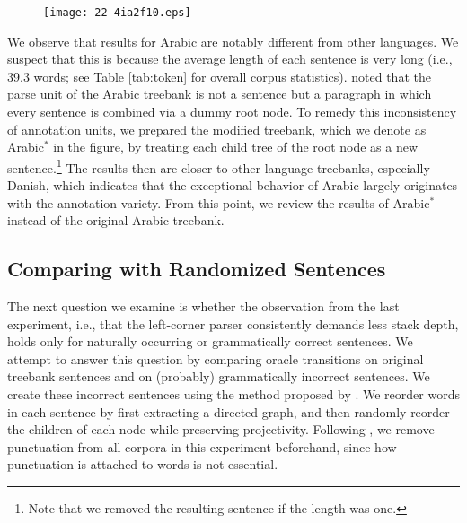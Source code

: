 \documentclass[english]{jnlp_1.4}
\begin{document}
\begin{figure}[p]
\begin{center}
\texttt{[image: 22-4ia2f10.eps]}
\end{center}
\label{fig:load-comparison}
\end{figure}

\begin{table}[p]
\label{tab:token}

\end{table}

We observe that results for Arabic are notably different from other languages.
We suspect that this is because the average length of each sentence is very long (i.e., 39.3 words; see Table \ref{tab:token} for overall corpus statistics).
 noted that the parse unit of the Arabic treebank is not a sentence but a paragraph in which every sentence is combined via a dummy root node.
To remedy this inconsistency of annotation units, we prepared the modified treebank, which we denote as Arabic$^*$ in the figure, by treating each child tree of the root node as a new sentence.\footnote{Note that we removed the resulting sentence if the length was one.}
The results then are closer to other language treebanks, especially Danish, which indicates that the exceptional behavior of Arabic largely originates with the annotation variety.
From this point, we review the results of Arabic$^*$ instead of the original Arabic treebank.


\subsection{Comparing with Randomized Sentences}
\label{sec:random}

The next question we examine is whether the observation from the last experiment, i.e., that the left-corner parser consistently demands less stack depth, holds only for naturally occurring or grammatically correct sentences.
We attempt to answer this question by comparing oracle transitions on original treebank sentences and on (probably) grammatically incorrect sentences.
We create these incorrect sentences using the method proposed by .
We reorder words in each sentence by first extracting a directed graph, and then randomly reorder the children of each node while preserving projectivity.
Following , we remove punctuation from all corpora in this experiment beforehand, since how punctuation is attached to words is not essential.
\end{document}
